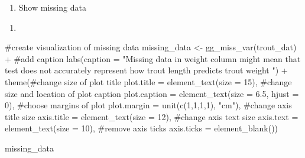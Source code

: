 \documentclass[
  letterpaper,
  DIV=11,
  numbers=noendperiod]{scrartcl}
\newenvironment{Shaded}{\begin{snugshade}}{\end{snugshade}}
\newcommand{\AttributeTok}[1]{\textcolor[rgb]{0.40,0.45,0.13}{#1}}
\newcommand{\CommentTok}[1]{\textcolor[rgb]{0.37,0.37,0.37}{#1}}
\newcommand{\DecValTok}[1]{\textcolor[rgb]{0.68,0.00,0.00}{#1}}
\newcommand{\FloatTok}[1]{\textcolor[rgb]{0.68,0.00,0.00}{#1}}
\newcommand{\FunctionTok}[1]{\textcolor[rgb]{0.28,0.35,0.67}{#1}}
\newcommand{\NormalTok}[1]{\textcolor[rgb]{0.00,0.23,0.31}{#1}}
\newcommand{\OtherTok}[1]{\textcolor[rgb]{0.00,0.23,0.31}{#1}}
\newcommand{\SpecialCharTok}[1]{\textcolor[rgb]{0.37,0.37,0.37}{#1}}
\newcommand{\StringTok}[1]{\textcolor[rgb]{0.13,0.47,0.30}{#1}}
\providecommand{\tightlist}{%
  \setlength{\itemsep}{0pt}\setlength{\parskip}{0pt}}\usepackage{longtable,booktabs,array}
\begin{document}
\begin{enumerate}
\def\labelenumi{\arabic{enumi}.}
\setcounter{enumi}{1}
\tightlist
\item
  Show missing data
\end{enumerate}

\begin{enumerate}
\def\labelenumi{\alph{enumi}.}
\tightlist
\item
\end{enumerate}

\begin{Shaded}
\begin{Highlighting}[]
\CommentTok{\#create visualization of missing data }
\NormalTok{missing\_data }\OtherTok{\textless{}{-}} \FunctionTok{gg\_miss\_var}\NormalTok{(trout\_dat) }\SpecialCharTok{+}
        \CommentTok{\#add caption}
        \FunctionTok{labs}\NormalTok{(}\AttributeTok{caption =} \StringTok{"Missing data in weight column might mean that test does not accurately represent how trout length predicts trout weight "}\NormalTok{) }\SpecialCharTok{+} 
        \FunctionTok{theme}\NormalTok{(}\CommentTok{\#change size of plot title }
        \AttributeTok{plot.title =} \FunctionTok{element\_text}\NormalTok{(}\AttributeTok{size =} \DecValTok{15}\NormalTok{),}
        \CommentTok{\#change size and location of plot caption}
        \AttributeTok{plot.caption =} \FunctionTok{element\_text}\NormalTok{(}\AttributeTok{size =} \FloatTok{6.5}\NormalTok{, }\AttributeTok{hjust =} \DecValTok{0}\NormalTok{),}
        \CommentTok{\#choose margins of plot }
        \AttributeTok{plot.margin =} \FunctionTok{unit}\NormalTok{(}\FunctionTok{c}\NormalTok{(}\DecValTok{1}\NormalTok{,}\DecValTok{1}\NormalTok{,}\DecValTok{1}\NormalTok{,}\DecValTok{1}\NormalTok{), }\StringTok{"cm"}\NormalTok{),}
        \CommentTok{\#change axis title size}
        \AttributeTok{axis.title =} \FunctionTok{element\_text}\NormalTok{(}\AttributeTok{size =} \DecValTok{12}\NormalTok{), }
        \CommentTok{\#change axis text size }
        \AttributeTok{axis.text =} \FunctionTok{element\_text}\NormalTok{(}\AttributeTok{size =} \DecValTok{10}\NormalTok{),}
        \CommentTok{\#remove axis ticks }
        \AttributeTok{axis.ticks =} \FunctionTok{element\_blank}\NormalTok{())}
      


\NormalTok{missing\_data}
\end{Highlighting}
\end{Shaded}
\end{document}
